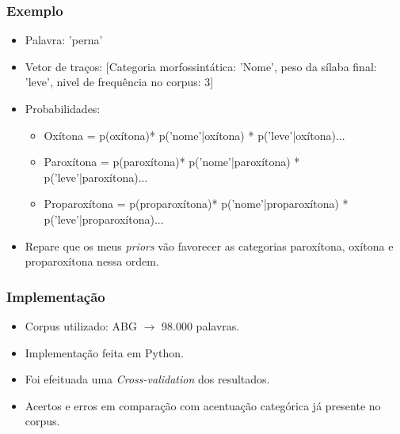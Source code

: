 \documentclass[xcolor=table]{beamer}
\begin{document}
	\begin{frame}
		\frametitle{Exemplo}
		\begin{itemize}
			\item Palavra: 'perna'\\
			\item Vetor de traços: [Categoria morfossintática: 'Nome', peso da sílaba final: 'leve', nivel de frequência no corpus: 3]\\
			\item Probabilidades:
			\begin{itemize}
				\item Oxítona = p(oxítona)* p('nome'|oxítona) * p('leve'|oxítona)...
				\item Paroxítona = p(paroxítona)* p('nome'|paroxítona) * p('leve'|paroxítona)...
				\item Proparoxítona = p(proparoxítona)* p('nome'|proparoxítona) * p('leve'|proparoxítona)...
			\end{itemize}
			\item Repare que os meus \textit{priors} vão favorecer as categorias paroxítona, oxítona e proparoxítona nessa ordem.\\
			
		\end{itemize}	
	\end{frame}
	\begin{frame}
		\frametitle{Implementação}
		\begin{itemize}
			\item Corpus utilizado: ABG $\rightarrow$ 98.000 palavras.\\
			\item Implementação feita em Python.\\
			\item Foi efeituada uma \textit{Cross-validation} dos resultados.\\
			\item Acertos e erros em comparação com acentuação categórica já presente no corpus.\\
		\end{itemize}
	\end{frame}

\end{document}
